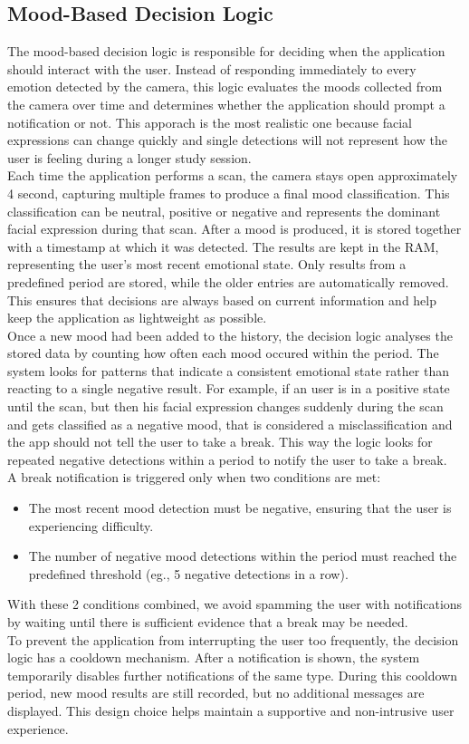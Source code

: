 \documentclass[12pt,a4paper]{article}
\begin{document}
\subsection{Mood-Based Decision Logic}
The mood-based decision logic is responsible for deciding when the application should interact with the user. Instead of responding immediately to every emotion detected by the camera, this logic evaluates the moods collected from the camera over time and determines whether the application should prompt a notification or not. This apporach is the most realistic one because facial expressions can change quickly and single detections will not represent how the user is feeling during a longer study session.\\
Each time the application performs a scan, the camera stays open approximately 4 second, capturing multiple frames to produce a final mood classification. This classification can be neutral, positive or negative and represents the dominant facial expression during that scan. After a mood is produced, it is stored together with a timestamp at which it was detected. The results are kept in the RAM, representing the user's most recent emotional state. Only results from a predefined period are stored, while the older entries are automatically removed. This ensures that decisions are always based on current information and help keep the application as lightweight as possible.\\
Once a new mood had been added to the history, the decision logic analyses the stored data by counting how often each mood occured within the period. The system looks for patterns that indicate a consistent emotional state rather than reacting to a single negative result. For example, if an user is in a positive state until the scan, but then his facial expression changes suddenly during the scan and gets classified as a negative mood, that is considered a misclassification and the app should not tell the user to take a break. This way the logic looks for repeated negative detections within a period to notify the user to take a break.\\
A break notification is triggered only when two conditions are met:
\begin{itemize}
\item The most recent mood detection must be negative, ensuring that the user is experiencing difficulty.
\item The number of negative mood detections within the period must reached the predefined threshold (eg., 5 negative detections in a row).
\end{itemize} 
With these 2 conditions combined, we avoid spamming the user with notifications by waiting until there is sufficient evidence that a break may be needed.\\
To prevent the application from interrupting the user too frequently, the decision logic has a cooldown mechanism. After a notification is shown, the system temporarily disables further notifications of the same type. During this cooldown period, new mood results are still recorded, but no additional messages are displayed. This design choice helps maintain a supportive and non-intrusive user experience.\\
\end{document}
